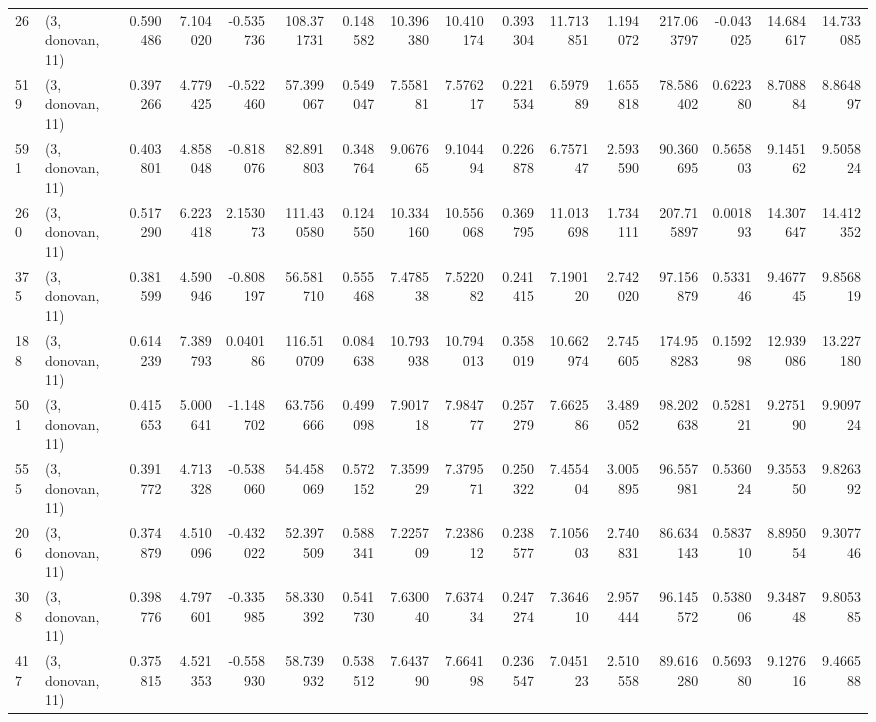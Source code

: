 \begin{tabular}{llrrrrrrrrrrrrrr}
26  &  (3, donovan, 11) &   0.590486 &   7.104020 &  -0.535736 &   108.371731 &   0.148582 &  10.396380 &  10.410174 &  0.393304 &  11.713851 &   1.194072 &    217.063797 &  -0.043025 &  14.684617 &   14.733085 \\
519 &  (3, donovan, 11) &   0.397266 &   4.779425 &  -0.522460 &    57.399067 &   0.549047 &   7.558181 &   7.576217 &  0.221534 &   6.597989 &   1.655818 &     78.586402 &   0.622380 &   8.708884 &    8.864897 \\
591 &  (3, donovan, 11) &   0.403801 &   4.858048 &  -0.818076 &    82.891803 &   0.348764 &   9.067665 &   9.104494 &  0.226878 &   6.757147 &   2.593590 &     90.360695 &   0.565803 &   9.145162 &    9.505824 \\
260 &  (3, donovan, 11) &   0.517290 &   6.223418 &   2.153073 &   111.430580 &   0.124550 &  10.334160 &  10.556068 &  0.369795 &  11.013698 &   1.734111 &    207.715897 &   0.001893 &  14.307647 &   14.412352 \\
375 &  (3, donovan, 11) &   0.381599 &   4.590946 &  -0.808197 &    56.581710 &   0.555468 &   7.478538 &   7.522082 &  0.241415 &   7.190120 &   2.742020 &     97.156879 &   0.533146 &   9.467745 &    9.856819 \\
188 &  (3, donovan, 11) &   0.614239 &   7.389793 &   0.040186 &   116.510709 &   0.084638 &  10.793938 &  10.794013 &  0.358019 &  10.662974 &   2.745605 &    174.958283 &   0.159298 &  12.939086 &   13.227180 \\
501 &  (3, donovan, 11) &   0.415653 &   5.000641 &  -1.148702 &    63.756666 &   0.499098 &   7.901718 &   7.984777 &  0.257279 &   7.662586 &   3.489052 &     98.202638 &   0.528121 &   9.275190 &    9.909724 \\
555 &  (3, donovan, 11) &   0.391772 &   4.713328 &  -0.538060 &    54.458069 &   0.572152 &   7.359929 &   7.379571 &  0.250322 &   7.455404 &   3.005895 &     96.557981 &   0.536024 &   9.355350 &    9.826392 \\
206 &  (3, donovan, 11) &   0.374879 &   4.510096 &  -0.432022 &    52.397509 &   0.588341 &   7.225709 &   7.238612 &  0.238577 &   7.105603 &   2.740831 &     86.634143 &   0.583710 &   8.895054 &    9.307746 \\
308 &  (3, donovan, 11) &   0.398776 &   4.797601 &  -0.335985 &    58.330392 &   0.541730 &   7.630040 &   7.637434 &  0.247274 &   7.364610 &   2.957444 &     96.145572 &   0.538006 &   9.348748 &    9.805385 \\
417 &  (3, donovan, 11) &   0.375815 &   4.521353 &  -0.558930 &    58.739932 &   0.538512 &   7.643790 &   7.664198 &  0.236547 &   7.045123 &   2.510558 &     89.616280 &   0.569380 &   9.127616 &    9.466588 \\

\end{tabular}
